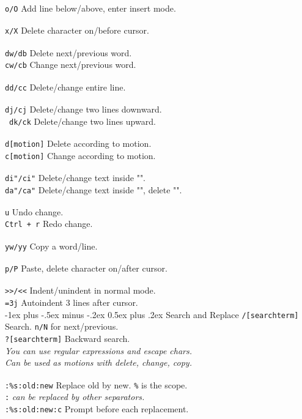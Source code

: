 \documentclass[10pt,landscape]{article}
\makeatletter
\renewcommand{\section}{\@startsection{section}{1}{0mm}%
                                {-1ex plus -.5ex minus -.2ex}%
                                {0.5ex plus .2ex}%
                                {\normalfont\large\bfseries}}
\makeatother
\begin{document}
\begin{multicols}{3}
\verb!o/O! \hfill Add line below/above, enter insert mode.\\
\verb! ! \\
\verb!x/X! \hfill Delete character on/before cursor.\\
\verb! !\\
\verb!dw/db! \hfill Delete next/previous word.\\
\verb!cw/cb! \hfill Change next/previous word.\\
\verb! !\\
\verb!dd/cc! \hfill Delete/change entire line.\\
\verb! !\\
\verb!dj/cj! \hfill Delete/change two lines downward.\\\
\verb!dk/ck! \hfill Delete/change two lines upward.\\
\verb! !\\
\verb!d[motion]! \hfill Delete according to motion.\\
\verb!c[motion]! \hfill Change according to motion.\\
\verb! !\\
\verb!di"/ci"! \hfill Delete/change text inside "".\\
\verb!da"/ca"! \hfill Delete/change text inside "", delete "".\\
\verb! ! \\
\verb!u! \hfill Undo change.\\
\verb!Ctrl + r! \hfill Redo change.\\
\verb! !\\
\verb!yw/yy! \hfill Copy a word/line.\\
\verb! ! \\
\verb!p/P! \hfill Paste, delete character on/after cursor.\\
\verb! !\\
\verb!>>/<<! \hfill Indent/unindent in normal mode.\\
\verb!=3j! \hfill Autoindent 3 lines after cursor.\\

\section{Search and Replace}
\verb!/[searchterm]! \hfill Search. \verb!n/N! for next/previous.\\
\verb!?[searchterm]! \hfill Backward search.\\
\textit{You can use regular expressions and escape chars.}\\
\textit{Can be used as motions with delete, change, copy.}\\
\verb! !\\
\verb!:%s:old:new! \hfill Replace old by new. \verb!%! is the scope.\\
\hfill \verb!:! \textit{can be replaced by other separators.}\\
\verb!:%s:old:new:c! \hfill Prompt before each replacement.\\


\end{multicols}
\end{document}
